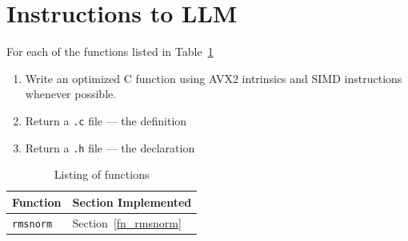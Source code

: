 \documentclass[letterpaper,12pt]{article}
\begin{document}
\section{Instructions to LLM}
For each of the functions listed in Table~\ref{list_of_fns}
\begin{enumerate}
  \item Write an optimized C function using AVX2 intrinsics and SIMD
    instructions whenever possible.
  \item Return a {\tt .c} file --- the definition
  \item Return a {\tt .h} file --- the declaration
\end{enumerate}
\begin{table}
\begin{tabular}{|l|l|} \hline \hline
  {\bf Function} & Section Implemented  \\ \hline \hline
  {\tt rmsnorm} & Section~\ref{fn_rmsnorm} \\ \hline
\end{tabular}
  \caption{Listing of functions}
  \label{list_of_fns}
\end{table}
\end{document}
